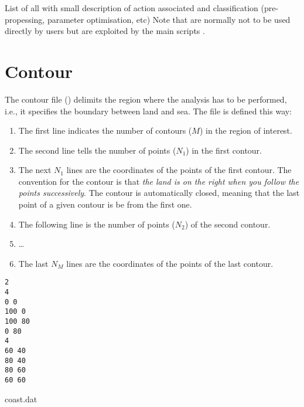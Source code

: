 List of all  with small description of action associated and classification (pre-propessing, parameter optimisation, etc)
Note that  are normally not to be used directly by users but are exploited by the main \diva scripts .





\section{Contour\label{contourdiva}}

The contour file () delimits the region where the analysis has to be performed, i.e., it specifies the boundary between land and sea. The file is defined this way:
\begin{enumerate}
\item The first line indicates the number of contours ($M$) in the region of interest.
\item The second line tells the number of points ($N_{1}$) in the first contour.
\item The next $N_1$ lines are the coordinates of the points of the first contour. The convention for the contour is that \textit{the land is on the right when you follow the points successively}. The contour is automatically closed, meaning that the last point of a given contour is be from the first one. 
\item The following line is the number of points ($N_{2}$) of the second contour.
\item \ldots
\item The last $N_M$ lines are the coordinates of the points of the last contour.
\end{enumerate}

\begin{exfile}[htpb]
\begin{footnotesize}
\texttt{2\\
4\\
0 0\\
100 0\\
100 80\\
0 80\\
4\\
60 40\\
80 40\\
80 60\\
60 60} 
\end{footnotesize}
\caption{coast.dat\label{ex:coast.dat}}
\end{exfile}

